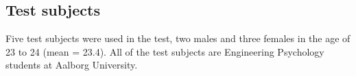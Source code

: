 \subsection*{Test subjects}
%
Five test subjects were used in the test, two males and three females in the age of 23 to 24 (mean = 23.4). All of the test subjects are Engineering Psychology students at Aalborg University. 